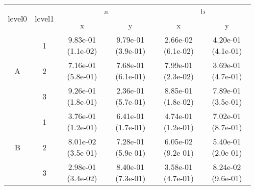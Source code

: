 \begin{tabular}{cccccc}
\toprule
\multirow{2}{*}{level0} & \multirow{2}{*}{level1}&\multicolumn{2}{c}{a}&\multicolumn{2}{c}{b}\tabularnewline
\cmidrule(lr){3-4}
\cmidrule(lr){5-6}
&&x&y&x&y\tabularnewline
\midrule
\multirow{3}{*}{A}&1& 9.83e-01 (1.1e-02)& 9.79e-01 (3.9e-01)& 2.66e-02 (6.1e-02)& 4.20e-01 (4.1e-01)\tabularnewline
&2& 7.16e-01 (5.8e-01)& 7.68e-01 (6.1e-01)& 7.99e-01 (2.3e-02)& 3.69e-01 (4.7e-01)\tabularnewline
&3& 9.26e-01 (1.8e-01)& 2.36e-01 (5.7e-01)& 8.85e-01 (1.8e-02)& 7.89e-01 (3.5e-01)\tabularnewline
\midrule
\multirow{3}{*}{B}&1& 3.76e-01 (1.2e-01)& 6.41e-01 (1.7e-01)& 4.74e-01 (1.2e-01)& 7.02e-01 (8.7e-01)\tabularnewline
&2& 8.01e-02 (3.5e-01)& 7.28e-01 (5.9e-01)& 6.05e-02 (9.2e-01)& 5.40e-01 (2.0e-01)\tabularnewline
&3& 2.98e-01 (3.4e-02)& 8.40e-01 (7.3e-01)& 3.58e-01 (4.7e-01)& 8.24e-02 (9.6e-01)\tabularnewline
\bottomrule
\end{tabular}
